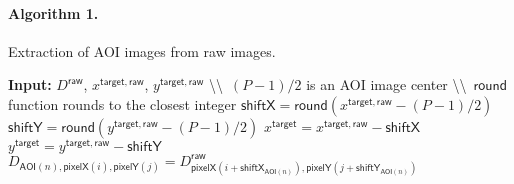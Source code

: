 \paragraph{Algorithm 1.} Extraction of AOI images from raw images. \\

\begin{algorithmic}[1]
\State \textbf{Input:} $D^\mathsf{raw}$, $x^{\mathsf{target},\mathsf{raw}}$, $y^{\mathsf{target},\mathsf{raw}}$
        \State \textbackslash\textbackslash~$(P-1)/2$ is an AOI image center
        \State \textbackslash\textbackslash~$\mathsf{round}$ function rounds to the closest integer
        \State $\mathsf{shiftX} = \mathsf{round} \left( x^{\mathsf{target},\mathsf{raw}} - (P - 1) / 2 \right) $
        \State $\mathsf{shiftY} = \mathsf{round} \left( y^{\mathsf{target},\mathsf{raw}} - (P - 1) / 2 \right) $
        \State $x^\mathsf{target} = x^{\mathsf{target}, \mathsf{raw}} - \mathsf{shiftX}$
        \State $y^\mathsf{target} = y^{\mathsf{target}, \mathsf{raw}} - \mathsf{shiftY}$
        \State $D_{\mathsf{AOI}(n), \mathsf{pixelX}(i), \mathsf{pixelY}(j)} = D^{\mathsf{raw}}_{\mathsf{pixelX}(i+\mathsf{shiftX}_{\mathsf{AOI}(n)}), \mathsf{pixelY}(j+\mathsf{shiftY}_{\mathsf{AOI}(n)})}$
    \EndFor
\EndFor
\end{algorithmic}